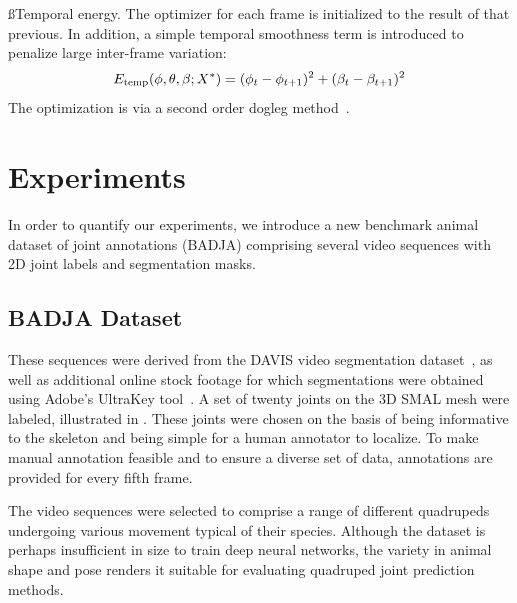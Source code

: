 \ss{Temporal energy.}
The optimizer for each frame is initialized to the result of that previous. In addition, a simple temporal smoothness term is introduced to penalize large inter-frame variation:
\begin{equation}
E_\textrm{temp}(\phi, \theta, \beta; X^{*}) = (\phi_t - \phi_{t+1})^2 + (\beta_t - \beta_{t+1})^2
\end{equation}
The optimization is via a second order dogleg method~\cite{lourakis2005levenberg}.

\section{Experiments}
In order to quantify our experiments, we introduce a new benchmark animal dataset of joint annotations (BADJA) comprising several video sequences with 2D joint labels and segmentation masks.

\subsection{BADJA Dataset}
These sequences were derived from the DAVIS video segmentation dataset~\cite{Perazzi2016}, as well as additional online stock footage for which segmentations were obtained using Adobe's UltraKey tool~\cite{adobe_ultrakey}. A set of twenty joints on the 3D SMAL mesh were labeled, illustrated in . These joints were chosen on the basis of being informative to the skeleton and being simple for a human annotator to localize. To make manual annotation feasible and to ensure a diverse set of data, annotations are provided for every fifth frame. 

The video sequences were selected to comprise a range of different quadrupeds undergoing various movement typical of their species. Although the dataset is perhaps insufficient in size to train deep neural networks, the variety in animal shape and pose renders it suitable for evaluating quadruped joint prediction methods. 


